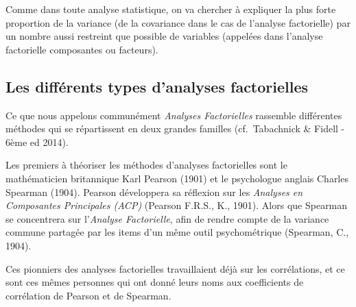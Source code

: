 \documentclass[
  french,
  11pt,
  a4paper,
]{article}
\begin{document}
Comme dans toute analyse statistique, on va chercher à expliquer la plus
forte proportion de la variance (de la covariance dans le cas de
l'analyse factorielle) par un nombre aussi restreint que possible de
variables (appelées dans l'analyse factorielle composantes ou facteurs).

\subsection{Les différents types d'analyses
factorielles}\label{les-diffuxe9rents-types-danalyses-factorielles}

Ce que nous appelons communément \emph{Analyses Factorielles} rassemble
différentes méthodes qui se répartissent en deux grandes familles
(cf.~Tabachnick \& Fidell - 6ème ed 2014).

Les premiers à théoriser les méthodes d'analyses factorielles sont le
mathématicien britannique Karl Pearson (1901) et le psychologue anglais
Charles Spearman (1904). Pearson développera sa réflexion sur les
\emph{Analyses en Composantes Principales (ACP)} (Pearson F.R.S., K.,
1901). Alors que Spearman se concentrera sur l'\emph{Analyse
Factorielle}, afin de rendre compte de la variance commune partagée par
les items d'un même outil psychométrique (Spearman, C., 1904).

Ces pionniers des analyses factorielles travaillaient déjà sur les
corrélations, et ce sont ces mêmes personnes qui ont donné leurs noms
aux coefficients de corrélation de Pearson et de Spearman.
\end{document}

